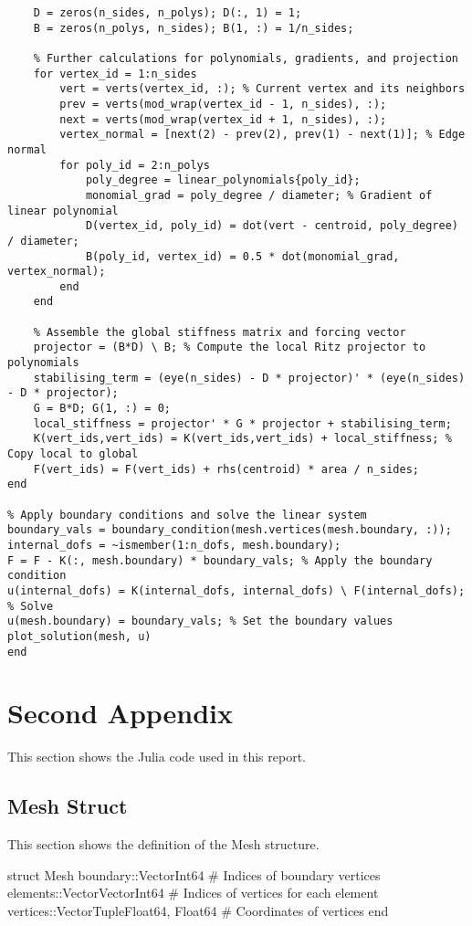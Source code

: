 \begin{appendices}
\begin{lstlisting}[style=MatlabStyle]
    % Initialize D and B matrices for projection
    D = zeros(n_sides, n_polys); D(:, 1) = 1;
    B = zeros(n_polys, n_sides); B(1, :) = 1/n_sides;
    
    % Further calculations for polynomials, gradients, and projection
    for vertex_id = 1:n_sides
        vert = verts(vertex_id, :); % Current vertex and its neighbors
        prev = verts(mod_wrap(vertex_id - 1, n_sides), :);
        next = verts(mod_wrap(vertex_id + 1, n_sides), :);
        vertex_normal = [next(2) - prev(2), prev(1) - next(1)]; % Edge normal
        for poly_id = 2:n_polys
            poly_degree = linear_polynomials{poly_id};
            monomial_grad = poly_degree / diameter; % Gradient of linear polynomial
            D(vertex_id, poly_id) = dot(vert - centroid, poly_degree) / diameter;
            B(poly_id, vertex_id) = 0.5 * dot(monomial_grad, vertex_normal);
        end
    end

    % Assemble the global stiffness matrix and forcing vector
    projector = (B*D) \ B; % Compute the local Ritz projector to polynomials
    stabilising_term = (eye(n_sides) - D * projector)' * (eye(n_sides) - D * projector);
    G = B*D; G(1, :) = 0;
    local_stiffness = projector' * G * projector + stabilising_term;
    K(vert_ids,vert_ids) = K(vert_ids,vert_ids) + local_stiffness; % Copy local to global
    F(vert_ids) = F(vert_ids) + rhs(centroid) * area / n_sides;
end

% Apply boundary conditions and solve the linear system
boundary_vals = boundary_condition(mesh.vertices(mesh.boundary, :));
internal_dofs = ~ismember(1:n_dofs, mesh.boundary);
F = F - K(:, mesh.boundary) * boundary_vals; % Apply the boundary condition
u(internal_dofs) = K(internal_dofs, internal_dofs) \ F(internal_dofs); % Solve
u(mesh.boundary) = boundary_vals; % Set the boundary values
plot_solution(mesh, u)
end
\end{lstlisting}

\section{Second Appendix}
This section shows the Julia code used in this report. 

\subsection{Mesh Struct}
This section shows the definition of the Mesh structure.


\begin{jllisting}[style=JuliaStyle]
struct Mesh
    boundary::Vector{Int64}    # Indices of boundary vertices
    elements::Vector{Vector{Int64}}  # Indices of vertices for each element
    vertices::Vector{Tuple{Float64, Float64}}  # Coordinates of vertices
end
\end{jllisting}


\end{appendices}
